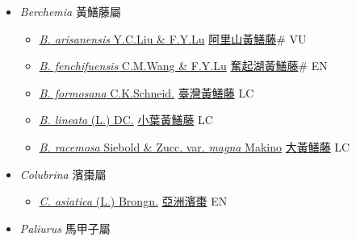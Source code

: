 
  \begin{itemize}
 \item[] \textit{Berchemia} 黃鱔藤屬
                    
  \begin{itemize}
        \item[] \href{http://www.theplantlist.org/tpl1.1/search?q=Berchemia+arisanensis}{\textit{B. arisanensis} Y.C.Liu \& F.Y.Lu}   \href{\detokenize{http://taibnet.sinica.edu.tw/chi/taibnet_species_list.php?T2=阿里山黃鱔藤&T2_new_value=true&fr=y}}{阿里山黃鱔藤}\# VU
        \item[] \href{http://www.theplantlist.org/tpl1.1/search?q=Berchemia+fenchifuensis}{\textit{B. fenchifuensis} C.M.Wang \& F.Y.Lu}   \href{\detokenize{http://taibnet.sinica.edu.tw/chi/taibnet_species_list.php?T2=奮起湖黃鱔藤&T2_new_value=true&fr=y}}{奮起湖黃鱔藤}\# EN
        \item[] \href{http://www.theplantlist.org/tpl1.1/search?q=Berchemia+formosana}{\textit{B. formosana} C.K.Schneid.}   \href{\detokenize{http://taibnet.sinica.edu.tw/chi/taibnet_species_list.php?T2=臺灣黃鱔藤&T2_new_value=true&fr=y}}{臺灣黃鱔藤} LC
        \item[] \href{http://www.theplantlist.org/tpl1.1/search?q=Berchemia+lineata}{\textit{B. lineata} (L.) DC.}   \href{\detokenize{http://taibnet.sinica.edu.tw/chi/taibnet_species_list.php?T2=小葉黃鱔藤&T2_new_value=true&fr=y}}{小葉黃鱔藤} LC
        \item[] \href{http://www.theplantlist.org/tpl1.1/search?q=Berchemia+racemosa+var.+magna}{\textit{B. racemosa} Siebold \& Zucc. var. \textit{magna} Makino}   \href{\detokenize{http://taibnet.sinica.edu.tw/chi/taibnet_species_list.php?T2=大黃鱔藤&T2_new_value=true&fr=y}}{大黃鱔藤} LC
  \end{itemize}
 \item[] \textit{Colubrina} 濱棗屬
                    
  \begin{itemize}
        \item[] \href{http://www.theplantlist.org/tpl1.1/search?q=Colubrina+asiatica}{\textit{C. asiatica} (L.) Brongn.}   \href{\detokenize{http://taibnet.sinica.edu.tw/chi/taibnet_species_list.php?T2=亞洲濱棗&T2_new_value=true&fr=y}}{亞洲濱棗} EN
  \end{itemize}
 \item[] \textit{Paliurus} 馬甲子屬
                    

\end{itemize}
